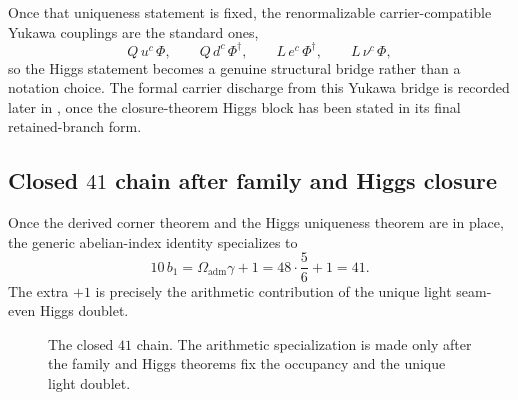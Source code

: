 \documentclass[11pt,a4paper]{article}
\theoremstyle{definition}
\theoremstyle{remark}
\newcommand{\bone}{b_1}
\newcommand{\Oadm}{\Omega_{\mathrm{adm}}}
\begin{document}
Once that uniqueness statement is fixed, the renormalizable carrier-compatible Yukawa couplings
are the standard ones,
\[
Q\,u^c\,\Phi,
\qquad
Q\,d^c\,\Phi^\dagger,
\qquad
L\,e^c\,\Phi^\dagger,
\qquad
L\,\nu^c\,\Phi,
\]
so the Higgs statement becomes a genuine structural bridge rather than a notation choice. The
formal carrier discharge from this Yukawa bridge is recorded later in
, once the closure-theorem Higgs block has
been stated in its final retained-branch form.

\subsection{Closed \texorpdfstring{$41$}{41} chain after family and Higgs closure}

Once the derived corner theorem and the Higgs uniqueness theorem are in place, the generic
abelian-index identity  specializes to
\begin{equation}
\label{eq:41-chain-specialized}
10\,\bone
=
\Oadm\gamma+1
=
48\cdot\frac56+1
=
41.
\end{equation}
The extra $+1$ is precisely the arithmetic contribution of the unique light seam-even Higgs
doublet.

\begin{figure}[t]
\centering
\footnotesize
{}
\caption{The closed $41$ chain. The arithmetic specialization is made only after the family and
Higgs theorems fix the occupancy and the unique light doublet.}
\label{fig:41-chain-strip}
\end{figure}
\end{document}
